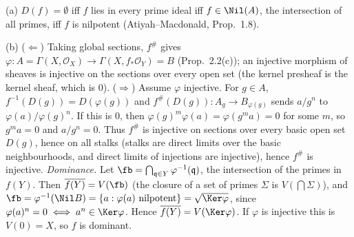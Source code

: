 \documentclass[11pt]{article}
\begin{document}
\pf
(a) $D(f)=\emptyset$ iff $f$ lies in every prime ideal iff $f\in\Nil(A)$, the intersection of all primes, iff $f$ is nilpotent (Atiyah--Macdonald, Prop.~1.8).

(b) ($\Leftarrow$) Taking global sections, $f^\#$ gives $\varphi:A=\Gamma(X,\mathcal O_X)\to\Gamma(X,f_*\mathcal O_Y)=B$ (Prop.~2.2(c)); an injective morphism of sheaves is injective on the sections over every open set (the kernel presheaf is the kernel sheaf, which is $0$).
($\Rightarrow$) Assume $\varphi$ injective. For $g\in A$, $f^{-1}(D(g))=D(\varphi(g))$ and $f^\#(D(g)):A_g\to B_{\varphi(g)}$ sends $a/g^n$ to $\varphi(a)/\varphi(g)^n$. If this is $0$, then $\varphi(g)^m\varphi(a)=\varphi(g^ma)=0$ for some $m$, so $g^ma=0$ and $a/g^n=0$. Thus $f^\#$ is injective on sections over every basic open set $D(g)$, hence on all stalks (stalks are direct limits over the basic neighbourhoods, and direct limits of injections are injective), hence $f^\#$ is injective.
\emph{Dominance.} Let $\fb=\bigcap_{\mathfrak q\in Y}\varphi^{-1}(\mathfrak q)$, the intersection of the primes in $f(Y)$. Then $\overline{f(Y)}=V(\fb)$ (the closure of a set of primes $\Sigma$ is $V(\bigcap\Sigma)$), and $\fb=\varphi^{-1}(\Nil B)=\{a:\varphi(a)\text{ nilpotent}\}=\sqrt{\Ker\varphi}$, since $\varphi(a)^n=0\iff a^n\in\Ker\varphi$. Hence $\overline{f(Y)}=V(\Ker\varphi)$. If $\varphi$ is injective this is $V(0)=X$, so $f$ is dominant.
\end{document}

